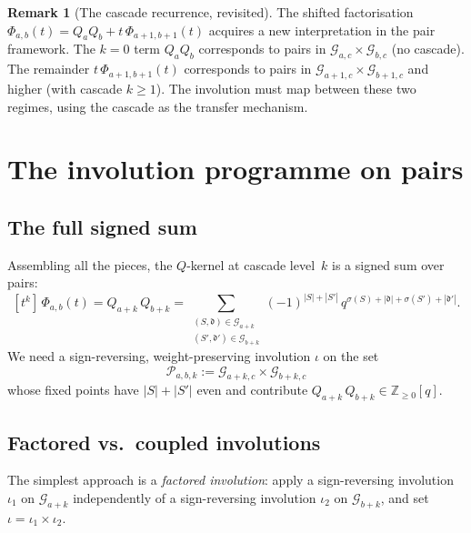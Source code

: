 \documentclass[11pt]{article}
\newcommand{\Z}{\mathbb{Z}}
\theoremstyle{plain}
\theoremstyle{definition}
\newtheorem{remark}[theorem]{Remark}
\begin{document}
\begin{remark}[The cascade recurrence, revisited]
\label{rem:cascade-pair}
The shifted factorisation $\Phi_{a,b}(t) = Q_a Q_b + t\,
\Phi_{a+1,b+1}(t)$ acquires a new interpretation in the
pair framework.  The $k = 0$ term $Q_a Q_b$ corresponds to
pairs in $\mathcal{G}_{a,c} \times \mathcal{G}_{b,c}$ (no
cascade).  The remainder $t\, \Phi_{a+1,b+1}(t)$ corresponds
to pairs in $\mathcal{G}_{a+1,c} \times \mathcal{G}_{b+1,c}$
and higher (with cascade $k \geq 1$).  The involution must
map between these two regimes, using the cascade as the
transfer mechanism.
\end{remark}


\section{The involution programme on pairs}
\label{sec:pair-programme}

\subsection{The full signed sum}

Assembling all the pieces, the $Q$-kernel at cascade level~$k$ is
a signed sum over pairs:
\[
  [t^k]\, \Phi_{a,b}(t) = Q_{a+k}\, Q_{b+k}
  = \!\!\!\!
    \sum_{\substack{(S,\mathfrak{d}) \in \mathcal{G}_{a+k} \\
      (S',\mathfrak{d}') \in \mathcal{G}_{b+k}}}
    \!\!\!\!
    (-1)^{|S|+|S'|}\,
    q^{\sigma(S) + |\mathfrak{d}|
      + \sigma(S') + |\mathfrak{d}'|}.
\]
We need a sign-reversing, weight-preserving involution
$\iota$ on the set
\begin{equation}\label{eq:pair-set}
  \mathcal{P}_{a,b,k}
  := \mathcal{G}_{a+k,c} \times \mathcal{G}_{b+k,c}
\end{equation}
whose fixed points have $|S| + |S'|$ even and contribute
$Q_{a+k}\, Q_{b+k} \in \Z_{\geq 0}[q]$.

\subsection{Factored vs.\ coupled involutions}

The simplest approach is a \emph{factored involution}:
apply a sign-reversing involution $\iota_1$ on
$\mathcal{G}_{a+k}$ independently of a sign-reversing
involution $\iota_2$ on $\mathcal{G}_{b+k}$, and set
$\iota = \iota_1 \times \iota_2$.
\end{document}
